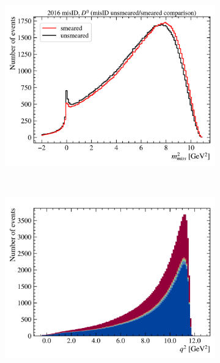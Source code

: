 \begin{figure}[htb]
    \hfill
    \begin{subfigure}[b]{0.32\textwidth}
        \centering
        \includegraphics[width=\textwidth]{figs-fit-fit-templates/data-driven-plots/misid/D0_mm2_comp.pdf}
    \end{subfigure}
    \\
    \begin{subfigure}[b]{0.32\textwidth}
        \centering
        \includegraphics[width=\textwidth]{figs-fit-fit-templates/data-driven-plots/misid/D0_q2.pdf}
    \end{subfigure}
    \hfill
    \begin{subfigure}[b]{0.32\textwidth}
        \centering

\end{subfigure}
\end{figure}
